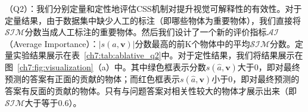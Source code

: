 \textbf{}（Q2）：我们分别定量和定性地评估CSS机制对提升视觉可解释性的有效性。对于定量结果，由于数据集中缺少人工的标注（即哪些物体为重要物体），我们直接将$\mathcal{SIM}$分数当成人工标注的重要物体。然后我们设计了一个新的评价指标$\mathcal{AI}$（Average Importance）：$|s(a, \bm{v})|$分数最高的前K个物体中的平均$\mathcal{SIM}$分数。定量实验结果展示在表~\ref{ch7:tab:ablative_q2}中。对于定性结果，我们将结果展示在图~\ref{ch7:fig:visualization}（a）中。其中绿色框表示分数$s(\hat{a}, \bm{v})$大于0，即对最终预测的答案有正面的贡献的物体；而红色框表示$s(\hat{a}, \bm{v})$小于0，即对最终预测的答案有反面的贡献的物体。只有与问题答案对相关性较大的物体才展示出来（即$\mathcal{SIM}$大于等于0.6）。

\begin{table}[tbp]
    \begin{center}
    \end{center}
    \caption{数据集VQA-CP v2测试集的准确率}
    \label{ch7:tab:ablative_q1}
\end{table}

\begin{table}[tbp]
    \begin{center}
    \end{center}
    \caption{数据集VQA-CP v2测试集的$\mathcal{AI}$分数}
    \label{ch7:tab:ablative_q2}
\end{table}

